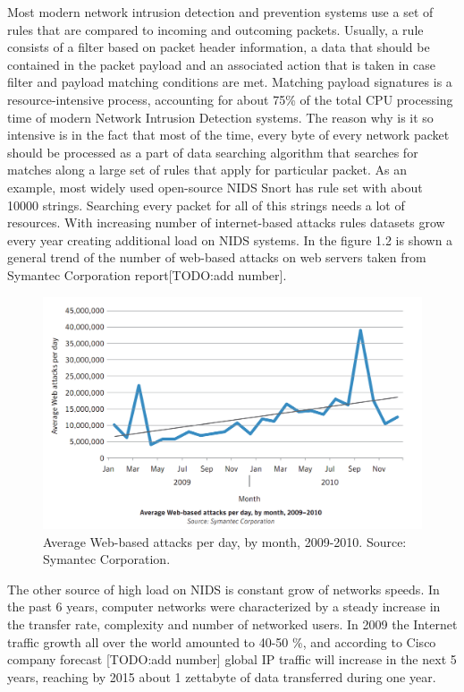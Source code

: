 \documentclass[thesis=M,english]{FITthesis}[2011/07/15]
\begin{document}
Most modern network intrusion detection and prevention systems use a set of rules that are compared to incoming and outcoming packets. Usually, a rule consists of a filter based on packet header information, a data that should be contained in the packet payload and an associated action that is taken in case filter and payload matching conditions are met.
Matching payload signatures is a resource-intensive process, accounting for about 75\% of the total CPU processing time of modern Network Intrusion Detection systems. The reason why is it so intensive is in the fact that most of the time, every byte of every network packet should be processed as a part of data searching algorithm that searches for matches along a large set of rules that apply for particular packet. As an example, most widely used open-source NIDS Snort has rule set with about 10000 strings. Searching every packet for all of this strings needs a lot of resources. With increasing number of internet-based attacks rules datasets grow every year creating additional load on NIDS systems. In the figure 1.2 is shown a general trend of the number of web-based attacks on web servers taken from Symantec Corporation report[TODO:add number].
\begin{figure}[h]
\centering
\includegraphics[scale=0.3]{images/web-attacks.png}
\caption{Average Web-based attacks per day, by month, 2009-2010. Source: Symantec Corporation.}
\end{figure}

The other source of high load on NIDS is constant grow of networks speeds. In the past 6 years, computer networks were characterized by a steady increase in the transfer rate, complexity and number of networked users. In 2009 the Internet traffic growth all over the world amounted to 40-50 \%, and according to Cisco company forecast [TODO:add number] global IP traffic will increase in the next 5 years, reaching by 2015 about 1 zettabyte of data transferred during one year.
\end{document}
